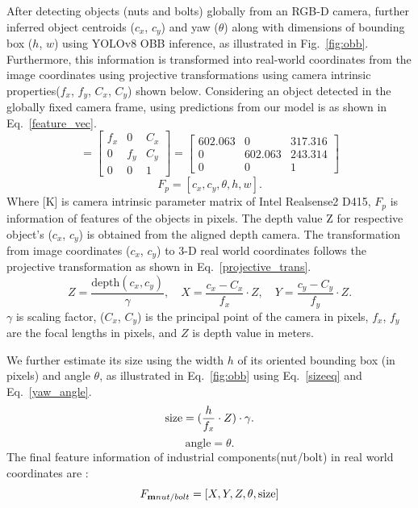 \documentclass[utf8]{FrontiersinHarvard}
\begin{document}
After detecting objects (nuts and bolts) globally from an RGB-D camera, further inferred object centroids ($c_{x}$, $c_{y}$) and yaw ($\theta$) along with dimensions of bounding box ($h$, $w$) using YOLOv8 OBB inference, as illustrated in Fig.~\ref{fig:obb}. Furthermore, this information is transformed into real-world coordinates from the image coordinates using projective transformations using camera intrinsic properties($f_{x}$, $f_{y}$, $C_{x}$, $C_{y}$) shown below. Considering an object detected in the globally fixed camera frame, using predictions from our model is as shown in Eq.~\ref{feature_vec}.
\begin{equation}
    [K] = \begin{bmatrix}
    f_{x} & 0 & C_{x} \\
    0 & f_{y} & C_{y} \\
    0 & 0 & 1
    \end{bmatrix} = \begin{bmatrix}
    602.063 & 0 & 317.316 \\
    0 & 602.063 & 243.314 \\
    0 & 0 & 1
\end{bmatrix}
\label{caliberation_matrix}
\end{equation}
\begin{equation}
F_{p} = [c_{x}, c_{y}, \theta, h, w].
\label{feature_vec}
\end{equation}
Where [K] is camera intrinsic parameter matrix of Intel Realsense2 D415, $F_{p}$ is information of features of the objects in pixels. The depth value Z for respective object's ($c_{x}$, $c_{y}$) is obtained from the aligned depth camera. The transformation from image coordinates ($c_{x}$, $c_{y}$) to 3-D real world coordinates follows the projective transformation as shown in Eq.~\ref{projective_trans}.
\begin{equation}
    Z = \frac{\text{depth}(c_x, c_y)}{\gamma}, \quad
    X = \frac{c_x - C_x}{f_x} \cdot Z, \quad
    Y = \frac{c_y - C_y}{f_y} \cdot Z.
    \label{projective_trans}
\end{equation}
$\gamma$ is scaling factor, ($C_{x}$, $C_{y}$) is the principal point of the camera in pixels, $f_{x}$, $f_{y}$ are the focal lengths in pixels, and $Z$ is depth value in meters.

We further estimate its size using the width $h$ of its oriented bounding box (in pixels) and angle $\theta$, as illustrated in Eq.~\ref{fig:obb} using Eq.~\ref{sizeeq} and Eq.~\ref{yaw_angle}.
\begin{equation}
        \text{size} = (\frac{h}{f_{x}} \cdot Z) \cdot \gamma. \\
    \label{sizeeq}
\end{equation}
\begin{equation}
    \text{angle} = \theta.
    \label{yaw_angle}
\end{equation}
The final feature information of industrial components(nut/bolt) in real world coordinates are : 
\begin{equation}
    F_{\textbf{m}\\ nut/bolt} = [X, Y, Z, \theta, \text{size}]
    \label{projective_transformation}
\end{equation}
\end{document}
